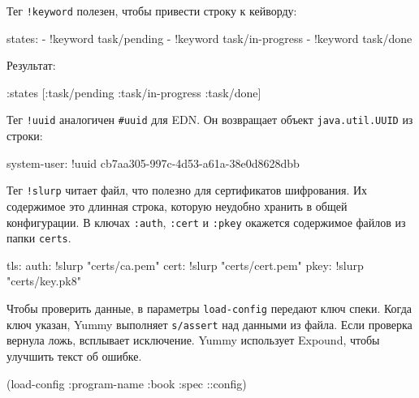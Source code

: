 \noindent
Тег \verb|!keyword| полезен, чтобы привести строку к кейворду:

\begin{english}
  \begin{yaml}
states:
  - !keyword task/pending
  - !keyword task/in-progress
  - !keyword task/done
  \end{yaml}
\end{english}

\noindent
Результат:

\begin{english}
  \begin{clojure}
{:states [:task/pending :task/in-progress :task/done]}
  \end{clojure}
\end{english}

Тег \verb|!uuid| аналогичен \verb|#uuid| для EDN. Он возвращает объект
\verb|java.util.UUID| из строки:

\begin{english}
  \begin{yaml}
system-user: !uuid cb7aa305-997c-4d53-a61a-38e0d8628dbb
  \end{yaml}
\end{english}

Тег \verb|!slurp| читает файл, что полезно для сертификатов шифрования. Их
содержимое это длинная строка, которую неудобно хранить в общей конфигурации. В
ключах \verb|:auth|, \verb|:cert| и \verb|:pkey| окажется содержимое
файлов из папки \verb|certs|.

\begin{english}
  \begin{yaml}
tls:
  auth: !slurp "certs/ca.pem"
  cert: !slurp "certs/cert.pem"
  pkey: !slurp "certs/key.pk8"
  \end{yaml}
\end{english}


Чтобы проверить данные, в параметры \verb|load-config| передают ключ
спеки. Когда ключ указан, Yummy выполняет \verb|s/assert| над данными из
файла. Если проверка вернула ложь, всплывает исключение. Yummy использует
Expound, чтобы улучшить текст об ошибке.

\begin{english}
  \begin{clojure}
(load-config {:program-name :book
              :spec ::config})
  \end{clojure}
\end{english}

